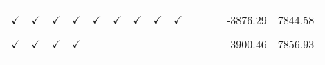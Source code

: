 \begin{table}[!h]
\begin{tabular}[t]{llllllllllllrr}
\cellcolor{gray!10}{$\checkmark$} & \cellcolor{gray!10}{$\checkmark$} & \cellcolor{gray!10}{$\checkmark$} & \cellcolor{gray!10}{$\checkmark$} & \cellcolor{gray!10}{$\checkmark$} & \cellcolor{gray!10}{$\checkmark$} & \cellcolor{gray!10}{$\checkmark$} & \cellcolor{gray!10}{$\checkmark$} & \cellcolor{gray!10}{} & \cellcolor{gray!10}{$\checkmark$} & \cellcolor{gray!10}{} & \cellcolor{gray!10}{} & \cellcolor{gray!10}{-3868.21} & \cellcolor{gray!10}{7844.42}\\
$\checkmark$ & $\checkmark$ & $\checkmark$ & $\checkmark$ & $\checkmark$ & $\checkmark$ & $\checkmark$ & $\checkmark$ & $\checkmark$ &  &  &  & -3876.29 & 7844.58\\
\cellcolor{gray!10}{$\checkmark$} & \cellcolor{gray!10}{$\checkmark$} & \cellcolor{gray!10}{$\checkmark$} & \cellcolor{gray!10}{$\checkmark$} & \cellcolor{gray!10}{$\checkmark$} & \cellcolor{gray!10}{$\checkmark$} & \cellcolor{gray!10}{$\checkmark$} & \cellcolor{gray!10}{$\checkmark$} & \cellcolor{gray!10}{} & \cellcolor{gray!10}{} & \cellcolor{gray!10}{$\checkmark$} & \cellcolor{gray!10}{} & \cellcolor{gray!10}{-3875.46} & \cellcolor{gray!10}{7844.91}\\
$\checkmark$ & $\checkmark$ & $\checkmark$ & $\checkmark$ &  &  &  &  &  &  &  &  & -3900.46 & 7856.93\\
\cellcolor{gray!10}{$\checkmark$} & \cellcolor{gray!10}{$\checkmark$} & \cellcolor{gray!10}{$\checkmark$} & \cellcolor{gray!10}{} & \cellcolor{gray!10}{} & \cellcolor{gray!10}{} & \cellcolor{gray!10}{} & \cellcolor{gray!10}{} & \cellcolor{gray!10}{} & \cellcolor{gray!10}{} & \cellcolor{gray!10}{} & \cellcolor{gray!10}{} & \cellcolor{gray!10}{-3919.87} & \cellcolor{gray!10}{7873.73}\\
\bottomrule
\end{tabular}
\end{table}
